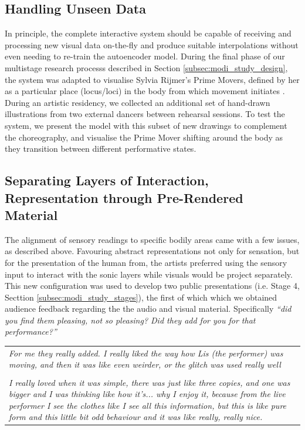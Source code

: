 \subsection*{Handling Unseen Data}

In principle, the complete interactive system should be capable of receiving and processing new visual data on-the-fly and produce suitable interpolations without even needing to re-train the autoencoder model. During the final phase of our multistage research processs described in Section \ref{subsec:modi_study_design}, the system was adapted to visualise Sylvia Rijmer's Prime Movers, defined by her as a particular place (locus/loci) in the body from which movement initiates \cite{jurgens_designing_2020}. During an artistic residency, we collected an additional set of hand-drawn illustrations from two external dancers between rehearsal sessions. To test the system, we present the model with this subset of new drawings to complement the choreography, and visualise the Prime Mover shifting around the body as they transition between different performative states.

\subsection*{Separating Layers of Interaction, Representation through Pre-Rendered Material}

The alignment of sensory readings to specific bodily areas came with a few issues, as described above. Favouring abstract representations not only for sensation, but for the presentation of the human from, the artists preferred using the sensory input to interact with the sonic layers while visuals would be project separately. This new configuration was used to develop two public presentations (i.e. Stage 4, Secttion \ref{subsec:modi_study_stages}), the first of which which we obtained audience feedback regarding the the audio and visual material. Specifically \textit{``did you find them pleasing, not so pleasing? Did they add for you for that performance?''}

\begin{center}
\begin{tabular}{ p{13cm}}
\textit{For me they really added. I really liked the way how Lis (the performer) was moving, and then it was like even weirder, or the glitch was used really well} \\
\\
\textit{I really loved when it was simple, there was just like three copies, and one was bigger and I was thinking like how it's... why I enjoy it, because from the live performer I see the clothes like I see all this information, but this is like pure form and this little bit odd behaviour and it was like really, really nice.}
\end{tabular}
\end{center}

